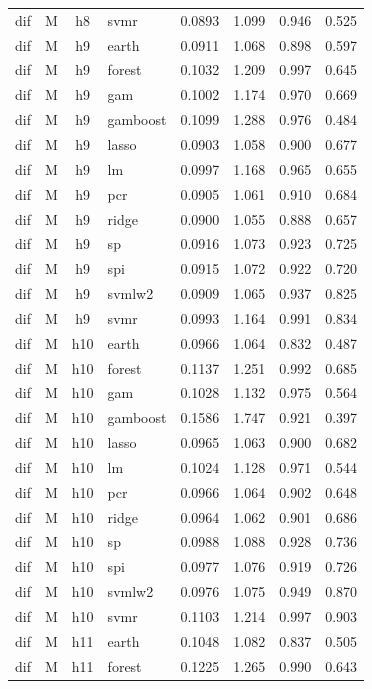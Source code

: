\begin{ThreePartTable}
\begin{longtable}[t]{llclcccc}
dif & M & h8 & svmr & 0.0893 & 1.099 & 0.946 & 0.525\\
\addlinespace
dif & M & h9 & earth & 0.0911 & 1.068 & 0.898 & 0.597\\
dif & M & h9 & forest & 0.1032 & 1.209 & 0.997 & 0.645\\
dif & M & h9 & gam & 0.1002 & 1.174 & 0.970 & 0.669\\
dif & M & h9 & gamboost & 0.1099 & 1.288 & 0.976 & 0.484\\
dif & M & h9 & lasso & 0.0903 & 1.058 & 0.900 & 0.677\\
dif & M & h9 & lm & 0.0997 & 1.168 & 0.965 & 0.655\\
dif & M & h9 & pcr & 0.0905 & 1.061 & 0.910 & 0.684\\
dif & M & h9 & ridge & 0.0900 & 1.055 & 0.888 & 0.657\\
dif & M & h9 & sp & 0.0916 & 1.073 & 0.923 & 0.725\\
dif & M & h9 & spi & 0.0915 & 1.072 & 0.922 & 0.720\\
dif & M & h9 & svmlw2 & 0.0909 & 1.065 & 0.937 & 0.825\\
dif & M & h9 & svmr & 0.0993 & 1.164 & 0.991 & 0.834\\
\addlinespace
dif & M & h10 & earth & 0.0966 & 1.064 & 0.832 & 0.487\\
dif & M & h10 & forest & 0.1137 & 1.251 & 0.992 & 0.685\\
dif & M & h10 & gam & 0.1028 & 1.132 & 0.975 & 0.564\\
dif & M & h10 & gamboost & 0.1586 & 1.747 & 0.921 & 0.397\\
dif & M & h10 & lasso & 0.0965 & 1.063 & 0.900 & 0.682\\
dif & M & h10 & lm & 0.1024 & 1.128 & 0.971 & 0.544\\
dif & M & h10 & pcr & 0.0966 & 1.064 & 0.902 & 0.648\\
dif & M & h10 & ridge & 0.0964 & 1.062 & 0.901 & 0.686\\
dif & M & h10 & sp & 0.0988 & 1.088 & 0.928 & 0.736\\
dif & M & h10 & spi & 0.0977 & 1.076 & 0.919 & 0.726\\
dif & M & h10 & svmlw2 & 0.0976 & 1.075 & 0.949 & 0.870\\
dif & M & h10 & svmr & 0.1103 & 1.214 & 0.997 & 0.903\\
\addlinespace
dif & M & h11 & earth & 0.1048 & 1.082 & 0.837 & 0.505\\
dif & M & h11 & forest & 0.1225 & 1.265 & 0.990 & 0.643\\

\end{longtable}
\end{ThreePartTable}
